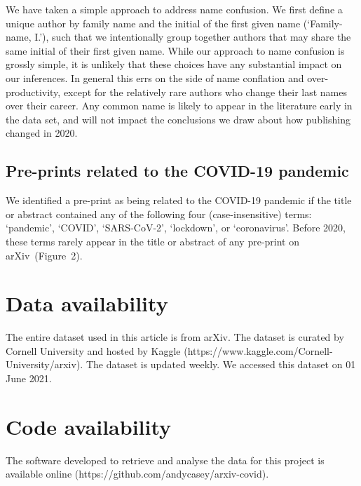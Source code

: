 \documentclass[a4paper,12pt]{article}
\newcommand{\arxiv}{arXiv}
\begin{document}
We have taken a simple approach to address name confusion. We first define a unique author by family name and the initial of the first given name (`Family-name, I.'), such that we intentionally group together authors that may share the same initial of their first given name. 
While our approach to name confusion is grossly simple, it is unlikely that these choices have any substantial impact on our inferences. In general this errs on the side of name conflation and over-productivity, except for the relatively rare authors who change their last names over their career.
Any common name is likely to appear in the literature early in the data set, and will not impact the conclusions we draw about how publishing changed in 2020. 

\subsection*{Pre-prints related to the COVID-19 pandemic}

We identified a pre-print as being related to the COVID-19 pandemic if the title or abstract contained any of the following four (case-insensitive) terms: `pandemic', `COVID', `SARS-CoV-2', `lockdown', or `coronavirus'. Before 2020, these terms rarely appear in the title or abstract of any pre-print on \arxiv\ (Figure~2).

\section*{Data availability}

The entire dataset used in this article is from \arxiv. The dataset is curated by Cornell University and hosted by Kaggle (https://www.kaggle.com/Cornell-University/arxiv). The dataset is updated weekly. We accessed this dataset on 01 June 2021.



\section*{Code availability}
The software developed to retrieve and analyse the data for this project is available online (https://github.com/andycasey/arxiv-covid).




 
\end{document}
